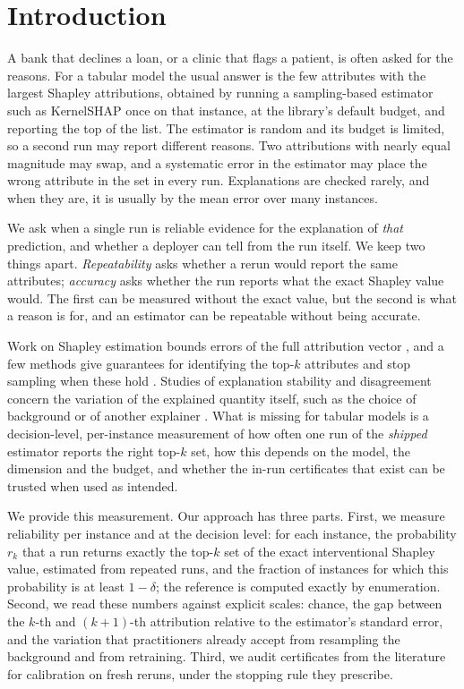 \section{Introduction}
\label{sec:intro}

A bank that declines a loan, or a clinic that flags a patient, is often asked for the reasons. For a tabular model the usual answer is the few attributes with the largest Shapley attributions, obtained by running a sampling-based estimator such as KernelSHAP \citep{lundberg2017unified} once on that instance, at the library's default budget, and reporting the top of the list. The estimator is random and its budget is limited, so a second run may report different reasons. Two attributions with nearly equal magnitude may swap, and a systematic error in the estimator may place the wrong attribute in the set in every run. Explanations are checked rarely, and when they are, it is usually by the mean error over many instances.

We ask when a single run is reliable evidence for the explanation of \emph{that} prediction, and whether a deployer can tell from the run itself. We keep two things apart. \emph{Repeatability} asks whether a rerun would report the same attributes; \emph{accuracy} asks whether the run reports what the exact Shapley value would. The first can be measured without the exact value, but the second is what a reason is for, and an estimator can be repeatable without being accurate.

Work on Shapley estimation bounds errors of the full attribution vector \citep{chen2023algorithms,musco2024leverage}, and a few methods give guarantees for identifying the top-$k$ attributes and stop sampling when these hold \citep{covert2021improving,kariyappa2024shapk,goldwasser2024significance,kolpaczki2025antithetic}. Studies of explanation stability and disagreement concern the variation of the explained quantity itself, such as the choice of background \citep{yuan2022background} or of another explainer \citep{krishna2022disagreement}. What is missing for tabular models is a decision-level, per-instance measurement of how often one run of the \emph{shipped} estimator reports the right top-$k$ set, how this depends on the model, the dimension and the budget, and whether the in-run certificates that exist can be trusted when used as intended.

We provide this measurement. Our approach has three parts. First, we measure reliability per instance and at the decision level: for each instance, the probability $r_k$ that a run returns exactly the top-$k$ set of the exact interventional Shapley value, estimated from repeated runs, and the fraction of instances for which this probability is at least $1-\delta$; the reference is computed exactly by enumeration. Second, we read these numbers against explicit scales: chance, the gap between the $k$-th and $(k{+}1)$-th attribution relative to the estimator's standard error, and the variation that practitioners already accept from resampling the background and from retraining. Third, we audit certificates from the literature for calibration on fresh reruns, under the stopping rule they prescribe.

